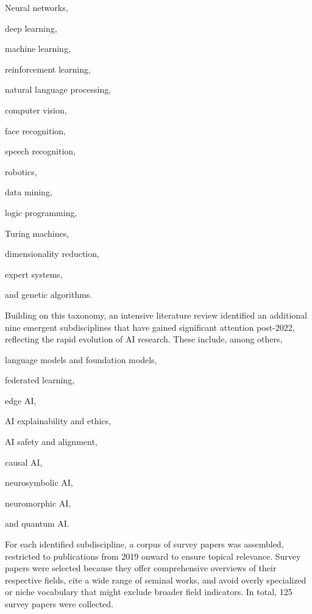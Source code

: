 \documentclass{article}
\begin{document}
\begin{inparaenum}[(1)]
	\item Neural networks,
	\item deep learning,
	\item machine learning,
	\item reinforcement learning,
	\item natural language processing,
	\item computer vision,
	\item face recognition,
	\item speech recognition,
	\item robotics,
	\item data mining,
	\item logic programming,
	\item Turing machines,
	\item dimensionality reduction,
	\item expert systems,
	\item and genetic algorithms.
\end{inparaenum}


Building on this taxonomy, an intensive literature review identified an additional nine emergent subdisciplines that have gained significant attention post-2022, reflecting the rapid evolution of AI research. These include, among others, 
\begin{inparaenum}[(1)]
	\setcounter{enumi}{15} %
	\item language models and foundation models,
	\item federated learning,
	\item edge AI,
	\item AI explainability and ethics,
	\item AI safety and alignment,
	\item causal AI,
	\item neurosymbolic AI,
	\item neuromorphic AI,
	\item and quantum AI.
\end{inparaenum}

For each identified subdiscipline, a corpus of survey papers was assembled, restricted to publications from 2019 onward to ensure topical relevance. Survey papers were selected because they offer comprehensive overviews of their respective fields, cite a wide range of seminal works, and avoid overly specialized or niche vocabulary that might exclude broader field indicators. In total, 125 survey papers were collected.
\end{document}
